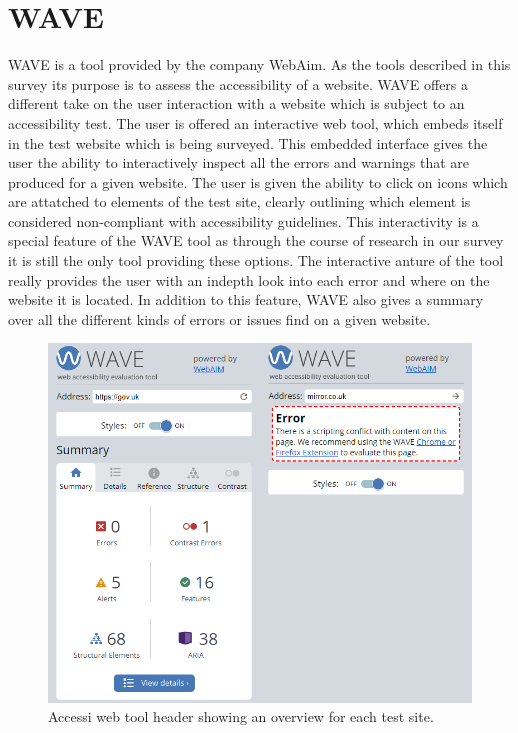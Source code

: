 \section{WAVE}

WAVE \parencite{WAVE_web} is a tool provided by the company WebAim. As the tools described in this survey its purpose is to assess the accessibility of a website. WAVE offers a different take on the user interaction with a website which is subject to an accessibility test. The user is offered an interactive web tool, which embeds itself in the test website which is being surveyed. This embedded interface gives the user the ability to interactively inspect all the errors and warnings that are produced for a given website. The user is given the ability to click on icons which are attatched to elements of the test site, clearly outlining which element is considered non-compliant with accessibility guidelines. This interactivity is a special feature of the WAVE tool as through the course of research in our survey it is still the only tool providing these options. The interactive anture of the tool really provides the user with an indepth look into each error and where on the website it is located. In addition to this feature, WAVE also gives a summary over all the different kinds of errors or issues find on a given website.


\begin{figure}[tp]
    \centering
    \includegraphics[keepaspectratio,width=\linewidth,height=\halfh]
    {images/WAVE.png}
    
    \caption[Accessi Overview]
    {%
    Accessi web tool header showing an overview for each test site.
    }
    \label{fig:accessi}
\end{figure}

